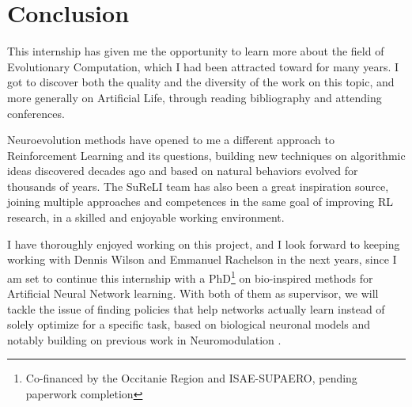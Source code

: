 \chapter*{Conclusion}
\label{chap:conclusion}

This internship has given me the opportunity to learn more about the field of Evolutionary Computation, which I had been attracted toward for many years. I got to discover both the quality and the diversity of the work on this topic, and more generally on Artificial Life, through reading bibliography and attending conferences. 

Neuroevolution methods have opened to me a different approach to Reinforcement Learning and its questions, building new techniques on algorithmic ideas discovered decades ago and based on natural behaviors evolved for thousands of years. The SuReLI team has also been a great inspiration source, joining multiple approaches and competences in the same goal of improving RL research, in a skilled and enjoyable working environment. 

I have thoroughly enjoyed working on this project, and I look forward to keeping working with Dennis Wilson and Emmanuel Rachelson in the next years, since I am set to continue this internship with a PhD\footnote{Co-financed by the Occitanie Region and ISAE-SUPAERO, pending paperwork completion} on bio-inspired methods for Artificial Neural Network learning. With both of them as supervisor, we will tackle the issue of finding policies that help networks actually learn instead of solely optimize for a specific task, based on biological neuronal models and notably building on previous work in Neuromodulation \cite{neuromodulation}. 



